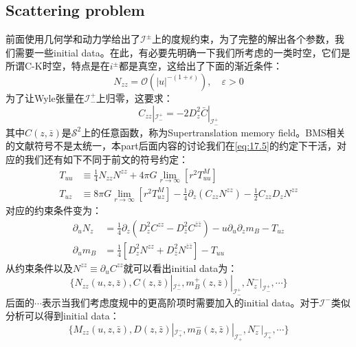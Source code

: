 \subsection{Scattering problem}
前面使用几何学和动力学给出了$\mathcal{I}^{\pm}$上的度规约束，为了完整的解出各个参数，我们需要一些initial data。在此，有必要先明确一下我们所考虑的一类时空，它们是所谓C-K时空\cite{ChristodoulouKlainerman+1994,PhysRevLett.67.1486}，特点是在$i^{\pm}$都是真空，这给出了下面的渐近条件：
\[N_{zz}=\mathcal{O}\left(|u|^{-(1+\varepsilon)}\right),\quad\varepsilon>0\]
为了让Wyle张量在$\mathcal{I}^+_-$上归零，这要求\cite{Strominger:2013jfa,Compere:2019qed}：
\begin{equation}
	C_{zz}|_{\mathcal{I}_{-}^{+}}=-2D_{z}^{2}\bar{C}|_{\mathcal{I}_{-}^{+}}
\end{equation}
其中$C(z,\bar z)$是$\mathcal{S}^2$上的任意函数，称为Supertranslation memory field。BMS相关的文献符号不是太统一，本part后面内容的讨论我们在\ref{eq:17.5}的约定下干活，对应的我们还有如下不同于前文的符号约定：
\begin{equation}
	\begin{aligned}
	T_{uu}&\equiv\frac{1}{4}N_{zz}N^{zz}+4\pi G\lim_{r\to\infty}\left[r^2T_{uu}^M\right]	\\
	T_{uz}&\equiv8\pi G\lim_{r\rightarrow\infty}\left[r^{2}T_{uz}^{M}\right]-\frac{1}{4}\partial_{z}\left(C_{zz}N^{zz}\right)-\frac{1}{2}C_{zz}D_{z}N^{zz}
	\end{aligned}
\end{equation}
对应的约束条件变为：
\begin{equation}
\begin{aligned}
	\partial_{u}N_{z}&=\frac{1}{4}\partial_{z}\left(D_{z}^{2}C^{zz}-D_{\bar{z}}^{2}C^{\bar{z}\bar{z}}\right)-u\partial_{u}\partial_{z}m_{B}-T_{uz}\\
	\partial_{u}m_{B}&=\frac{1}{4}\left[D_{z}^{2}N^{zz}+D_{\bar{z}}^{2}N^{\bar{z}\bar{z}}\right]-T_{uu}
\end{aligned}
\end{equation}
从约束条件以及$N^{zz}\equiv\partial_u C^{zz}$就可以看出initial data为：
\begin{equation}
	\{N_{zz}(u,z,\bar{z}),C(z,\bar{z})|_{\mathcal{I}_{-}^{+}},m^+_{B}(z,\bar{z})|_{\mathcal{I}_{-}^{+}},N^-_z|_{\mathcal{I}^+_-},\cdots\}
\end{equation}
后面的$\cdots$表示当我们考虑度规中的更高阶项时需要加入的initial data。对于$\mathcal{I}^-$类似分析可以得到initial data：
\begin{equation}
	\{M_{zz}(u,z,\bar{z}),D(z,\bar{z})|_{\mathcal{I}_{+}^{-}},m^-_{B}(z,\bar{z})|_{\mathcal{I}_{+}^{-}},N^-_z|_{\mathcal{I}^-_+},\cdots\}
\end{equation}

